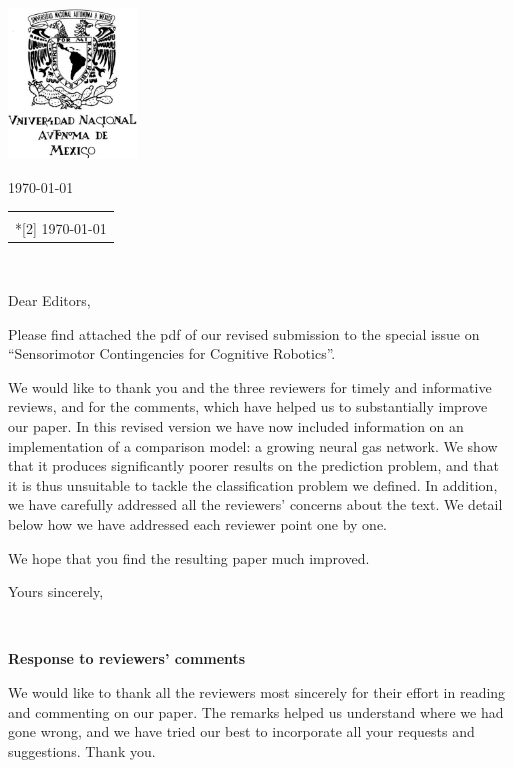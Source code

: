 \documentclass[letterpaper,12pt]{letter}
\author{Verónica Esther Arriola Ríos}
\makeatletter
\renewcommand*{\opening}[2]{\ifx\@empty\fromaddress
 \thispagestyle{firstpage}%
 {\raggedleft#2\par}%
 \else %
 \thispagestyle{empty}%
 {\raggedleft\begin{tabular}{l@{}}\ignorespaces
 \fromaddress \\*[2\parskip]%
 #2 \end{tabular}\par}%
 \fi
 \vspace{10\parskip}%
 {\raggedright \toname \\ \toaddress \par}%
 \vspace{2\parskip}%
 #1\par\nobreak}
\makeatother
\begin{document}
\begin{letter}{\textbf{}}
\includegraphics[height=4cm, keepaspectratio=true]{escudo_UNAM.jpg}\vspace*{-4cm}

\address{Universidad Nacional Autónoma de México\\ Facultad de Ciencias,\\ Departamento de Matemáticas,\\ México, D.F.}

\opening{Dear Editors,}{\today}
\vspace{1cm}

Please find attached the pdf of our revised submission to the special issue on “Sensorimotor Contingencies for Cognitive Robotics”. 

We would like to thank you and the three reviewers for timely and informative reviews, and for the comments, which have helped us to substantially improve our paper. In this revised version we have now included information on an implementation of a comparison model: a growing neural gas network. We show that it produces significantly poorer results on the prediction problem, and that it is thus unsuitable to tackle the classification problem we defined. In addition, we have carefully addressed all the reviewers’ concerns about the text. We detail below how we have addressed each reviewer point one by one.

We hope that you find the resulting paper much improved.


\vspace{1cm}

\signature{Verónica E. Arriola-Rios\\
Jeremy L Wyatt}

\closing{Yours sincerely,}


\end{letter}

\textbf{Response to reviewers’ comments}

We would like to thank all the reviewers most sincerely for their effort in reading and commenting on our paper. The remarks helped us understand where we had gone wrong, and we have tried our best to incorporate all your requests and suggestions. Thank you.
\end{document}
